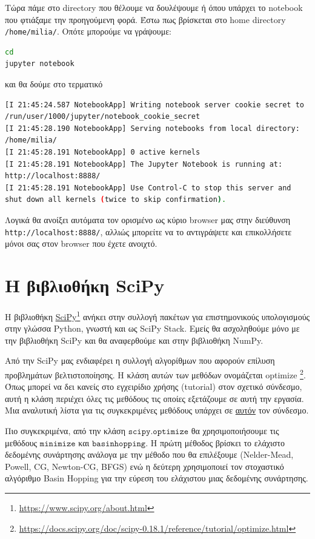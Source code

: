 \documentclass[a4paper,12pt,twoside]{report}
\theoremstyle{plain}
\theoremstyle{definition}
\theoremstyle{remark}
\begin{document}
Τώρα πάμε στο directory που θέλουμε να δουλέψουμε ή όπου υπάρχει το notebook που φτιάξαμε την  προηγούμενη φορά. Έστω πως βρίσκεται στο home directory \texttt{/home/milia/}. Οπότε μπορούμε να γράψουμε:
\begin{lstlisting}[extendedchars=true,language=bash]
cd
jupyter notebook
\end{lstlisting}

και θα δούμε στο τερματικό
\begin{lstlisting}[extendedchars=true,language=bash]
[I 21:45:24.587 NotebookApp] Writing notebook server cookie secret to
/run/user/1000/jupyter/notebook_cookie_secret
[I 21:45:28.190 NotebookApp] Serving notebooks from local directory:
/home/milia/
[I 21:45:28.191 NotebookApp] 0 active kernels 
[I 21:45:28.191 NotebookApp] The Jupyter Notebook is running at:
http://localhost:8888/
[I 21:45:28.191 NotebookApp] Use Control-C to stop this server and
shut down all kernels (twice to skip confirmation).
\end{lstlisting}

Λογικά θα ανοίξει αυτόματα τον ορισμένο ως κύριο browser μας στην διεύθυνση \texttt{http://localhost:8888/}, αλλιώς μπορείτε να το αντιγράψετε και επικολλήσετε μόνοι σας στον browser που έχετε ανοιχτό.

\section{Η βιβλιοθήκη SciPy}

Η βιβλιοθήκη \href{https://www.scipy.org/about.html}{SciPy}\footnote{\url{https://www.scipy.org/about.html}} ανήκει στην συλλογή πακέτων για επιστημονικούς υπολογισμούς στην γλώσσα Python, γνωστή και ως SciPy Stack. Εμείς θα ασχοληθούμε μόνο με την βιβλιοθήκη SciPy και θα αναφερθούμε και στην βιβλιοθήκη NumPy.

Από την SciPy μας ενδιαφέρει η συλλογή αλγορίθμων που αφορούν επίλυση προβλημάτων βελτιστοποίησης. Η κλάση αυτών των μεθόδων ονομάζεται optimize \footnote{\url{https://docs.scipy.org/doc/scipy-0.18.1/reference/tutorial/optimize.html}}. Όπως μπορεί να δει κανείς στο εγχειρίδιο χρήσης (tutorial) στον σχετικό σύνδεσμο, αυτή η κλάση περιέχει όλες τις μεθόδους τις οποίες εξετάζουμε σε αυτή την εργασία. Μια αναλυτική λίστα για τις συγκεκριμένες μεθόδους υπάρχει σε \href{https://docs.scipy.org/doc/scipy-0.18.1/reference/optimize.html#module-scipy.optimize}{αυτόν}  τον σύνδεσμο.

Πιο συγκεκριμένα, από την κλάση $\texttt{scipy.optimize}$ θα χρησιμοποιήσουμε τις μεθόδους $\texttt{minimize}$ και $\texttt{basinhopping}$. Η πρώτη μέθοδος βρίσκει το ελάχιστο δεδομένης συνάρτησης ανάλογα με την μέθοδο που θα επιλέξουμε (Nelder-Mead, Powell, CG, Newton-CG, BFGS) ενώ η δεύτερη χρησιμοποιεί τον στοχαστικό αλγόριθμο Basin Hopping για την εύρεση του ελάχιστου μιας δεδομένης συνάρτησης.
\end{document}
